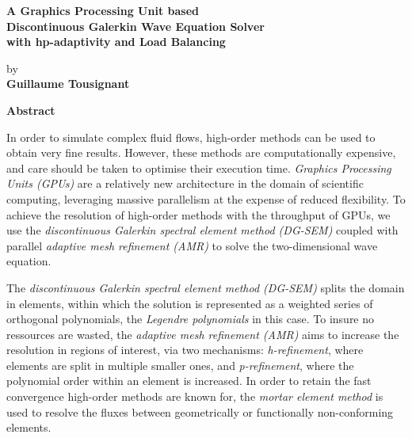 \thispagestyle{plain} %

\begin{center}
	\vspace*{0.5cm} %
	{ \Large
		\textbf{A Graphics Processing Unit based \\ 
			Discontinuous Galerkin Wave Equation Solver \\
			with hp-adaptivity and Load Balancing \\
		}
	}
	\vspace{0.4cm}
	\large

	by \\
	\vspace{0.4cm}
	\textbf{Guillaume Tousignant}
	
	\vspace{0.9cm}
	\textbf{Abstract}
	
\end{center}

In order to simulate complex fluid flows, high-order methods can be used to obtain very fine results. However,
these methods are computationally expensive, and care should be taken to optimise their execution time. 
\textit{Graphics Processing Units (GPUs)} are a relatively new architecture in the domain of scientific 
computing, leveraging massive parallelism at the expense of reduced flexibility. To achieve the resolution of
high-order methods with the throughput of GPUs, we use the \textit{discontinuous Galerkin spectral element 
method (DG-SEM)} coupled with parallel \textit{adaptive mesh refinement (AMR)} to solve the two-dimensional 
wave equation. 

The \textit{discontinuous Galerkin spectral element method (DG-SEM)} splits the domain in 
elements, within which the solution is represented as a weighted series of orthogonal polynomials, the 
\textit{Legendre polynomials} in this case. To insure no ressources are wasted, the \textit{adaptive mesh 
refinement (AMR)} aims to increase the resolution in regions of interest, via two mechanisms: 
\textit{h-refinement}, where elements are split in multiple smaller ones, and \textit{p-refinement}, where
the polynomial order within an element is increased. In order to retain the fast convergence high-order 
methods are known for, the \textit{mortar element method} is used to resolve the fluxes between geometrically
or functionally non-conforming elements.

